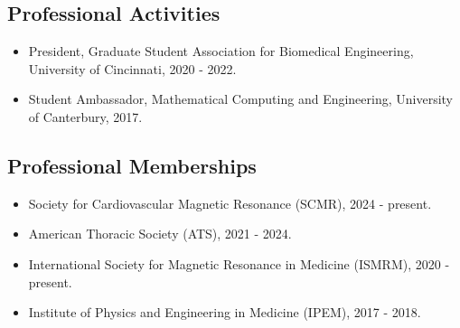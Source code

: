 \documentclass[12pt,]{scrartcl}
\begin{document}





\subsection{Professional Activities}\label{professional-activities}

\begin{itemize}
  \leftskip-0.25in
  \item President, Graduate Student Association for Biomedical Engineering, University of Cincinnati, 2020 - 2022.
  \item Student Ambassador, Mathematical Computing and Engineering, University of Canterbury, 2017.

\end{itemize}

\subsection{Professional Memberships}\label{professional-memberships}

\begin{itemize}
  \leftskip-0.25in
  \item Society for Cardiovascular Magnetic Resonance (SCMR), 2024 - present.
  \item American Thoracic Society (ATS), 2021 - 2024.
  \item International Society for Magnetic Resonance in Medicine (ISMRM), 2020 - present.
  \item Institute of Physics and Engineering in Medicine (IPEM), 2017 - 2018.
\end{itemize}
\end{document}
